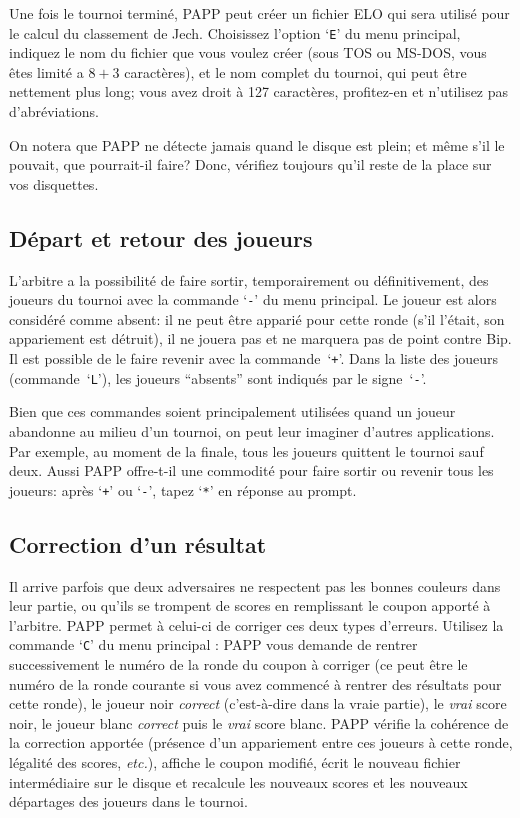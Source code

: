\documentclass[10pt]{article}
\begin{document}
Une fois le tournoi termin\'e, PAPP peut cr\'eer un fichier ELO
qui sera utilis\'e pour le calcul du classement de Jech.  Choisissez
l'option `\verb|E|' du menu principal, indiquez le nom du fichier que vous
voulez cr\'eer (sous TOS ou MS-DOS, vous \^etes limit\'e a $8+3$
caract\`eres), et le nom complet du tournoi, qui peut \^etre nettement plus
long; vous avez droit \`a 127 caract\`eres, profitez-en et n'utilisez pas
d'abr\'eviations.

On notera que PAPP ne d\'etecte jamais quand le disque est
plein; et m\^eme s'il le pouvait, que pourrait-il faire?  Donc, v\'erifiez
toujours qu'il reste de la place sur vos disquettes.

\subsection{D\'epart et retour des joueurs}

L'arbitre a la possibilit\'e de faire sortir, temporairement ou 
d\'efini\-tivement, des joueurs du tournoi avec la commande `\verb|-|' 
du menu principal.  Le joueur est alors consid\'er\'e comme absent: il 
ne peut \^etre appari\'e pour cette ronde (s'il l'\'etait, son 
appariement est d\'etruit), il ne jouera pas et ne marquera pas de 
point contre Bip.  Il est possible de le faire revenir avec la 
commande~`\verb|+|'.  Dans la liste des joueurs (commande~`\verb|L|'), 
les joueurs ``absents'' sont indiqu\'es par le signe~`\verb|-|'.

	Bien que ces commandes soient principalement utilis\'ees quand
un joueur abandonne au milieu d'un tournoi, on peut leur imaginer
d'autres applications.  Par exemple, au moment de la finale, tous les
joueurs quittent le tournoi sauf deux.  Aussi PAPP offre-t-il une
commodit\'e pour faire sortir ou revenir tous les joueurs: apr\`es
`\verb|+|' ou `\verb|-|', tapez `\verb|*|' en r\'eponse au prompt. 

\subsection{Correction d'un r\'esultat}

Il arrive parfois que deux adversaires ne respectent pas les bonnes 
couleurs dans leur partie, ou qu'ils se trompent de scores en 
remplissant le coupon apport\'e \`a l'arbitre.  PAPP permet \`a 
celui-ci de corriger ces deux types d'erreurs.  Utilisez la commande 
`\verb|C|' du menu principal : PAPP vous demande de rentrer 
successivement le num\'ero de la ronde du coupon \`a corriger (ce peut 
\^etre le num\'ero de la ronde courante si vous avez commenc\'e \`a 
rentrer des r\'esultats pour cette ronde), le joueur noir 
\emph{correct} (c'est-\`a-dire dans la vraie partie), le \emph{vrai} 
score noir, le joueur blanc \emph{correct} puis le \emph{vrai} score 
blanc.  PAPP v\'erifie la coh\'erence de la correction apport\'ee 
(pr\'esence d'un appariement entre ces joueurs \`a cette ronde, 
l\'egalit\'e des scores, \emph{etc.}), affiche le coupon modifi\'e, 
\'ecrit le nouveau fichier interm\'ediaire sur le disque et recalcule 
les nouveaux scores et les nouveaux d\'epartages des joueurs dans le 
tournoi.
\end{document}
